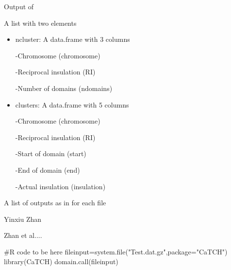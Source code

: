 \documentclass[letterpaper]{book}
\begin{document}
\begin{Value}
Output of

\begin{ldescription}
\item[\code{\code{domain.call}}]  A list with two elements
\begin{itemize}

\item{} ncluster: A data.frame with 3 columns

-Chromosome (chromosome)

-Reciprocal insulation (RI)

-Number of domains (ndomains)



\item{} clusters: A data.frame with 5 columns

-Chromosome (chromosome)

-Reciprocal insulation (RI)

-Start of domain (start)

-End of domain (end)

-Actual insulation (insulation)



\end{itemize}
	


\item[\code{\code{domain.call.parallel}}]   A list of outputs as in  for each file	
\end{ldescription}
\end{Value}
%
\begin{Author}\relax
Yinxiu Zhan
\end{Author}
%
\begin{References}\relax
Zhan et al....
\end{References}
%
\begin{Examples}
\begin{ExampleCode}
#R code to be here
	fileinput=system.file("Test.dat.gz",package="CaTCH")
	library(CaTCH)
	domain.call(fileinput)
\end{ExampleCode}
\end{Examples}
\printindex{}
\end{document}
